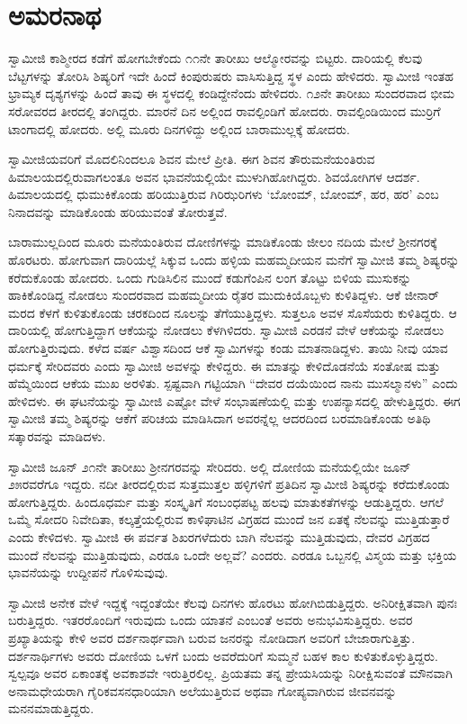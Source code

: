 
\chapter{ಅಮರನಾಥ }

 ಸ್ವಾಮೀಜಿ ಕಾಶ್ಮೀರದ ಕಡೆಗೆ ಹೋಗಬೇಕೆಂದು ೧೧ನೇ ತಾರೀಖು ಆಲ್ಮೋರವನ್ನು ಬಿಟ್ಟರು. ದಾರಿಯಲ್ಲಿ ಕೆಲವು ಬೆಟ್ಟಗಳನ್ನು ತೋರಿಸಿ ಶಿಷ್ಯರಿಗೆ ಇದೇ ಹಿಂದೆ ಕಿಂಪುರುಷರು ವಾಸಿಸುತ್ತಿದ್ದ ಸ್ಥಳ ಎಂದು ಹೇಳಿದರು. ಸ್ವಾಮೀಜಿ ಇಂತಹ ಭ್ರಾಮ್ಯಕ ದೃಶ್ಯಗಳನ್ನು ಹಿಂದೆ ತಾವು ಈ ಸ್ಥಳದಲ್ಲಿ ಕಂಡಿದ್ದೇನೆಂದು ಹೇಳಿದರು. ೧೨ನೇ ತಾರೀಖು ಸುಂದರವಾದ ಭೀಮ ಸರೋವರದ ತೀರದಲ್ಲಿ ತಂಗಿದ್ದರು. ಮಾರನೆ ದಿನ ಅಲ್ಲಿಂದ ರಾವಲ್ಪಿಂಡಿಗೆ ಹೋದರು. ರಾವಲ್ಪಿಂಡಿಯಿಂದ ಮುರ‍್ರಿಗೆ ಟಾಂಗಾದಲ್ಲಿ ಹೋದರು. ಅಲ್ಲಿ ಮೂರು ದಿನಗಳಿದ್ದು ಅಲ್ಲಿಂದ ಬಾರಾಮುಲ್ಲಕ್ಕೆ ಹೋದರು. 

 ಸ್ವಾಮೀಜಿಯವರಿಗೆ ಮೊದಲಿನಿಂದಲೂ ಶಿವನ ಮೇಲೆ ಪ್ರೀತಿ. ಈಗ ಶಿವನ ತೌರುಮನೆಯಂತಿರುವ ಹಿಮಾಲಯದಲ್ಲಿರುವಾಗಲಂತೂ ಅವನ ಭಾವನೆಯಲ್ಲಿಯೇ ಮುಳುಗಿಹೋಗಿದ್ದರು. ಶಿವಯೋಗಿಗಳ ಆದರ್ಶ. ಹಿಮಾಲಯದಲ್ಲಿ ಧುಮುಕಿಕೊಂಡು ಹರಿಯುತ್ತಿರುವ ಗಿರಿಝರಿಗಳು ‘ಬೋಂಮ್, ಬೋಂಮ್, ಹರ, ಹರ’ ಎಂಬ ನಿನಾದವನ್ನು ಮಾಡಿಕೊಂಡು ಹರಿಯುವಂತೆ ತೋರುತ್ತವೆ. 

 ಬಾರಾಮುಲ್ಲದಿಂದ ಮೂರು ಮನೆಯಂತಿರುವ ದೋಣಿಗಳನ್ನು ಮಾಡಿಕೊಂಡು ಜೀಲಂ ನದಿಯ ಮೇಲೆ ಶ‍್ರೀನಗರಕ್ಕೆ ಹೊರಟರು. ಹೋಗುವಾಗ ದಾರಿಯಲ್ಲೆ ಸಿಕ್ಕುವ ಒಂದು ಹಳ್ಳಿಯ ಮಹಮ್ಮದೀಯನ ಮನೆಗೆ ಸ್ವಾಮೀಜಿ ತಮ್ಮ ಶಿಷ್ಯರನ್ನು ಕರೆದುಕೊಂಡು ಹೋದರು. ಒಂದು ಗುಡಿಸಿಲಿನ ಮುಂದೆ ಕಡುಗೆಂಪಿನ ಲಂಗ ತೊಟ್ಟು ಬಿಳಿಯ ಮುಸುಕನ್ನು ಹಾಕಿಕೊಂಡಿದ್ದ ನೋಡಲು ಸುಂದರವಾದ ಮಹಮ್ಮದೀಯ ರೈತರ ಮುದುಕಿಯೊಬ್ಬಳು ಕುಳಿತಿದ್ದಳು. ಆಕೆ ಜೀನಾರ್ ಮರದ ಕೆಳಗೆ ಕುಳಿತುಕೊಂಡು ಚರಕದಿಂದ ನೂಲನ್ನು ತೆಗೆಯುತ್ತಿದ್ದಳು. ಸುತ್ತಲೂ ಅವಳ ಸೊಸೆಯರು ಕುಳಿತಿದ್ದರು. ಆ ದಾರಿಯಲ್ಲಿ ಹೋಗುತ್ತಿದ್ದಾಗ ಆಕೆಯನ್ನು ನೋಡಲು ಕೆಳಗಿಳಿದರು. ಸ್ವಾಮೀಜಿ ಎರಡನೆ ವೇಳೆ ಆಕೆಯನ್ನು ನೋಡಲು ಹೋಗುತ್ತಿರುವುದು. ಕಳೆದ ವರ್ಷ ವಿಶ್ವಾಸದಿಂದ ಆಕೆ ಸ್ವಾಮಿಗಳನ್ನು ಕಂಡು ಮಾತನಾಡಿದ್ದಳು. ತಾಯಿ ನೀವು ಯಾವ ಧರ್ಮಕ್ಕೆ ಸೇರಿದವರು ಎಂದು ಸ್ವಾಮೀಜಿ ಅವಳನ್ನು ಕೇಳಿದ್ದರು. ಈ ಮಾತನ್ನು ಕೇಳಿದೊಡನೆಯೆ ಸಂತೋಷ ಮತ್ತು ಹೆಮ್ಮೆಯಿಂದ ಆಕೆಯ ಮುಖ ಅರಳಿತು. ಸ್ಪಷ್ಟವಾಗಿ ಗಟ್ಟಿಯಾಗಿ “ದೇವರ ದಯೆಯಿಂದ ನಾನು ಮುಸಲ್ಮಾನಳು” ಎಂದು ಹೇಳಿದಳು. ಈ ಘಟನೆಯನ್ನು ಸ್ವಾಮೀಜಿ ಎಷ್ಟೋ‌ ವೇಳೆ ಸಂಭಾಷಣೆಯಲ್ಲಿ ಮತ್ತು ಉಪನ್ಯಾಸದಲ್ಲಿ ಹೇಳುತ್ತಿದ್ದರು. ಈಗ ಸ್ವಾಮೀಜಿ ತಮ್ಮ ಶಿಷ್ಯರನ್ನು ಆಕೆಗೆ ಪರಿಚಯ ಮಾಡಿಸಿದಾಗ ಅವರನ್ನೆಲ್ಲ ಆದರದಿಂದ ಬರಮಾಡಿಕೊಂಡು ಅತಿಥಿ ಸತ್ಕಾರವನ್ನು ಮಾಡಿದಳು. 

 ಸ್ವಾಮೀಜಿ ಜೂನ್ ೨೧ನೇ ತಾರೀಖು ಶ‍್ರೀನಗರವನ್ನು ಸೇರಿದರು. ಅಲ್ಲಿ ದೋಣಿಯ ಮನೆಯಲ್ಲಿಯೇ ಜೂನ್ ೨೫ರವರೆಗೂ ಇದ್ದರು. ನದೀ ತೀರದಲ್ಲಿರುವ ಸುತ್ತಮುತ್ತಲ ಹಳ್ಳಿಗಳಿಗೆ ಪ್ರತಿದಿನ ಸ್ವಾಮೀಜಿ ಶಿಷ್ಯರನ್ನು ಕರೆದುಕೊಂಡು ಹೋಗುತ್ತಿದ್ದರು. ಹಿಂದೂಧರ್ಮ ಮತ್ತು ಸಂಸ್ಕೃತಿಗೆ ಸಂಬಂಧಪಟ್ಟ ಹಲವು ಮಾತುಕತೆಗಳನ್ನು ಆಡುತ್ತಿದ್ದರು. ಆಗಲೆ ಒಮ್ಮೆ ಸೋದರಿ ನಿವೇದಿತಾ, ಕಲ್ಕತ್ತೆಯಲ್ಲಿರುವ ಕಾಳಿಘಾಟಿನ ವಿಗ್ರಹದ ಮುಂದೆ ಜನ ಏತಕ್ಕೆ ನೆಲವನ್ನು ಮುತ್ತಿಡುತ್ತಾರೆ ಎಂದು ಕೇಳಿದಳು. ಸ್ವಾಮೀಜಿ ಈ ಪರ್ವತ ಶಿಖರಗಳೆದುರು ಬಾಗಿ ನೆಲವನ್ನು ಮುತ್ತಿಡುವುದು, ದೇವರ ವಿಗ್ರಹದ ಮುಂದೆ ನೆಲವನ್ನು ಮುತ್ತಿಡುವುದು, ಎರಡೂ ಒಂದೇ ಅಲ್ಲವೆ? ಎಂದರು. ಎರಡೂ ಒಬ್ಬನಲ್ಲಿ ವಿಸ್ಮಯ ಮತ್ತು ಭಕ್ತಿಯ ಭಾವನೆಯನ್ನು ಉದ್ದೀಪನೆ ಗೊಳಿಸುವುವು. 

 ಸ್ವಾಮೀಜಿ ಅನೇಕ ವೇಳೆ ಇದ್ದಕ್ಕೆ ಇದ್ದಂತೆಯೇ ಕೆಲವು ದಿನಗಳು ಹೊರಟು ಹೋಗಿಬಿಡುತ್ತಿದ್ದರು. ಅನಿರೀಕ್ಷಿತವಾಗಿ ಪುನಃ ಬರುತ್ತಿದ್ದರು. ಇತರರೊಂದಿಗೆ ಇರುವುದು ಒಂದು ಯಾತನೆ ಎಂಬಂತೆ ಅವರು ಅನುಭವಿಸುತ್ತಿದ್ದರು. ಅವರ ಪ್ರಖ್ಯಾತಿಯನ್ನು ಕೇಳಿ ಅವರ ದರ್ಶನಾರ್ಥವಾಗಿ ಬರುವ ಜನರನ್ನು ನೋಡಿದಾಗ ಅವರಿಗೆ ಬೇಜಾರಾಗುತ್ತಿತ್ತು. ದರ್ಶನಾರ್ಥಿಗಳು ಅವರು ದೋಣಿಯ ಒಳಗೆ ಬಂದು ಅವರೆದುರಿಗೆ ಸುಮ್ಮನೆ ಬಹಳ ಕಾಲ ಕುಳಿತುಕೊಳ್ಳುತ್ತಿದ್ದರು. ಸ್ವಲ್ಪವೂ ಅವರ ಏಕಾಂತಕ್ಕೆ ಅವಕಾಶವೇ ಇರುತ್ತಿರಲಿಲ್ಲ. ಪ್ರಿಯತಮ ತನ್ನ ಪ್ರೇಯಸಿಯನ್ನು ನಿರೀಕ್ಷಿಸುವಂತೆ ಮೌನವಾಗಿ ಅನಾಮಧೇಯರಾಗಿ ಗೈರಿಕವಸನಧಾರಿಯಾಗಿ ಅಲೆಯುತ್ತಿರುವ ಅಥವಾ ಗೋಪ್ಯವಾಗಿರುವ ಜೀವನವನ್ನು ಮನನಮಾಡುತ್ತಿದ್ದರು. 

